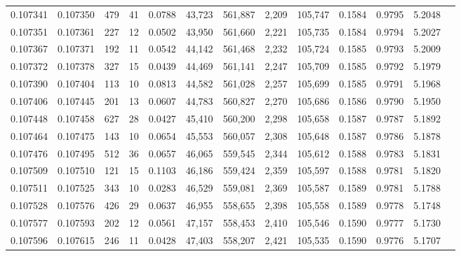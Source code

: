 \begin{tabular}{rrrrrrrrrrrrr}
0.107341 & 0.107350 &   479 &  41 &                                     0.0788 &  43,723 & 561,887 &   2,209 & 105,747 & 0.1584 & 0.9795 & 5.2048 \\
0.107351 & 0.107361 &   227 &  12 &                                     0.0502 &  43,950 & 561,660 &   2,221 & 105,735 & 0.1584 & 0.9794 & 5.2027 \\
0.107367 & 0.107371 &   192 &  11 &                                     0.0542 &  44,142 & 561,468 &   2,232 & 105,724 & 0.1585 & 0.9793 & 5.2009 \\
0.107372 & 0.107378 &   327 &  15 &                                     0.0439 &  44,469 & 561,141 &   2,247 & 105,709 & 0.1585 & 0.9792 & 5.1979 \\
0.107390 & 0.107404 &   113 &  10 &                                     0.0813 &  44,582 & 561,028 &   2,257 & 105,699 & 0.1585 & 0.9791 & 5.1968 \\
0.107406 & 0.107445 &   201 &  13 &                                     0.0607 &  44,783 & 560,827 &   2,270 & 105,686 & 0.1586 & 0.9790 & 5.1950 \\
0.107448 & 0.107458 &   627 &  28 &                                     0.0427 &  45,410 & 560,200 &   2,298 & 105,658 & 0.1587 & 0.9787 & 5.1892 \\
0.107464 & 0.107475 &   143 &  10 &                                     0.0654 &  45,553 & 560,057 &   2,308 & 105,648 & 0.1587 & 0.9786 & 5.1878 \\
0.107476 & 0.107495 &   512 &  36 &                                     0.0657 &  46,065 & 559,545 &   2,344 & 105,612 & 0.1588 & 0.9783 & 5.1831 \\
0.107509 & 0.107510 &   121 &  15 &                                     0.1103 &  46,186 & 559,424 &   2,359 & 105,597 & 0.1588 & 0.9781 & 5.1820 \\
0.107511 & 0.107525 &   343 &  10 &                                     0.0283 &  46,529 & 559,081 &   2,369 & 105,587 & 0.1589 & 0.9781 & 5.1788 \\
0.107528 & 0.107576 &   426 &  29 &                                     0.0637 &  46,955 & 558,655 &   2,398 & 105,558 & 0.1589 & 0.9778 & 5.1748 \\
0.107577 & 0.107593 &   202 &  12 &                                     0.0561 &  47,157 & 558,453 &   2,410 & 105,546 & 0.1590 & 0.9777 & 5.1730 \\
0.107596 & 0.107615 &   246 &  11 &                                     0.0428 &  47,403 & 558,207 &   2,421 & 105,535 & 0.1590 & 0.9776 & 5.1707 \\

\end{tabular}
